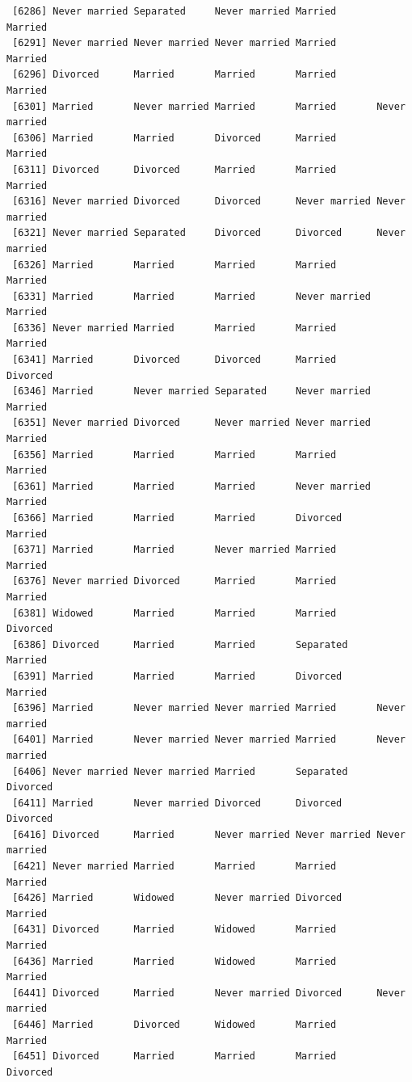 \documentclass[
  letterpaper,
  DIV=11,
  numbers=noendperiod,
  oneside]{scrartcl}
\begin{document}
\begin{verbatim}
 [6286] Never married Separated     Never married Married       Married      
 [6291] Never married Never married Never married Married       Married      
 [6296] Divorced      Married       Married       Married       Married      
 [6301] Married       Never married Married       Married       Never married
 [6306] Married       Married       Divorced      Married       Married      
 [6311] Divorced      Divorced      Married       Married       Married      
 [6316] Never married Divorced      Divorced      Never married Never married
 [6321] Never married Separated     Divorced      Divorced      Never married
 [6326] Married       Married       Married       Married       Married      
 [6331] Married       Married       Married       Never married Married      
 [6336] Never married Married       Married       Married       Married      
 [6341] Married       Divorced      Divorced      Married       Divorced     
 [6346] Married       Never married Separated     Never married Married      
 [6351] Never married Divorced      Never married Never married Married      
 [6356] Married       Married       Married       Married       Married      
 [6361] Married       Married       Married       Never married Married      
 [6366] Married       Married       Married       Divorced      Married      
 [6371] Married       Married       Never married Married       Married      
 [6376] Never married Divorced      Married       Married       Married      
 [6381] Widowed       Married       Married       Married       Divorced     
 [6386] Divorced      Married       Married       Separated     Married      
 [6391] Married       Married       Married       Divorced      Married      
 [6396] Married       Never married Never married Married       Never married
 [6401] Married       Never married Never married Married       Never married
 [6406] Never married Never married Married       Separated     Divorced     
 [6411] Married       Never married Divorced      Divorced      Divorced     
 [6416] Divorced      Married       Never married Never married Never married
 [6421] Never married Married       Married       Married       Married      
 [6426] Married       Widowed       Never married Divorced      Married      
 [6431] Divorced      Married       Widowed       Married       Married      
 [6436] Married       Married       Widowed       Married       Married      
 [6441] Divorced      Married       Never married Divorced      Never married
 [6446] Married       Divorced      Widowed       Married       Married      
 [6451] Divorced      Married       Married       Married       Divorced     

\end{verbatim}
\end{document}
